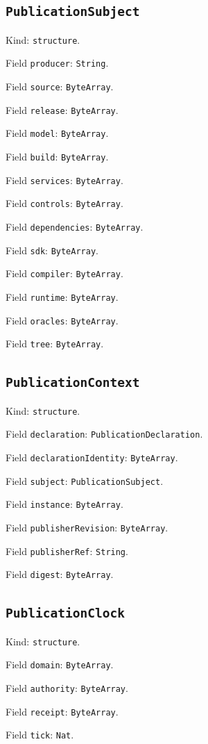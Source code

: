\documentclass[11pt]{article}
\begin{document}
\subsection*{\texttt{PublicationSubject}}
\noindent Kind: \texttt{structure}.\par
\noindent Field \texttt{producer}: \texttt{String}.\par
\noindent Field \texttt{source}: \texttt{ByteArray}.\par
\noindent Field \texttt{release}: \texttt{ByteArray}.\par
\noindent Field \texttt{model}: \texttt{ByteArray}.\par
\noindent Field \texttt{build}: \texttt{ByteArray}.\par
\noindent Field \texttt{services}: \texttt{ByteArray}.\par
\noindent Field \texttt{controls}: \texttt{ByteArray}.\par
\noindent Field \texttt{dependencies}: \texttt{ByteArray}.\par
\noindent Field \texttt{sdk}: \texttt{ByteArray}.\par
\noindent Field \texttt{compiler}: \texttt{ByteArray}.\par
\noindent Field \texttt{runtime}: \texttt{ByteArray}.\par
\noindent Field \texttt{oracles}: \texttt{ByteArray}.\par
\noindent Field \texttt{tree}: \texttt{ByteArray}.\par
\subsection*{\texttt{PublicationContext}}
\noindent Kind: \texttt{structure}.\par
\noindent Field \texttt{declaration}: \texttt{PublicationDeclaration}.\par
\noindent Field \texttt{declarationIdentity}: \texttt{ByteArray}.\par
\noindent Field \texttt{subject}: \texttt{PublicationSubject}.\par
\noindent Field \texttt{instance}: \texttt{ByteArray}.\par
\noindent Field \texttt{publisherRevision}: \texttt{ByteArray}.\par
\noindent Field \texttt{publisherRef}: \texttt{String}.\par
\noindent Field \texttt{digest}: \texttt{ByteArray}.\par
\subsection*{\texttt{PublicationClock}}
\noindent Kind: \texttt{structure}.\par
\noindent Field \texttt{domain}: \texttt{ByteArray}.\par
\noindent Field \texttt{authority}: \texttt{ByteArray}.\par
\noindent Field \texttt{receipt}: \texttt{ByteArray}.\par
\noindent Field \texttt{tick}: \texttt{Nat}.\par
\end{document}
